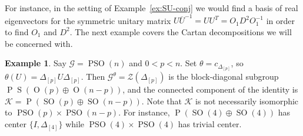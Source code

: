 \documentclass[reqno]{amsart}
\theoremstyle{definition} \newtheorem{example}[theorem]{Example}
\newcommand{\SO}{\operatorname{SO}}
\newcommand{\PSO}{\operatorname{PSO}}
\renewcommand{\O}{\operatorname{O}}
\renewcommand{\P}{\operatorname{P}}
\renewcommand{\S}{\operatorname{S}}
\newcommand{\G}{\mathcal{G}}
\newcommand{\K}{\mathcal{K}}
\newcommand{\Z}{\mathcal{Z}}
\begin{document}
For instance, in the setting of Example~\ref{ex:SU-conj} we would find a basis of real eigenvectors for the symmetric unitary matrix $U\overline{U}^{-1} = UU^T = O_1 D^2 O_1^{-1}$ in order to find $O_1$ and $D^2$. The next example covers the Cartan decompositions we will be concerned with.
\begin{example} \label{ex:SO-block}
Say $\G = \PSO(n)$ and $0 < p < n$. Set $\theta = c_{\Delta_{[p]}}$, so $\theta(U) = \Delta_{[p]}U\Delta_{[p]}$.  Then $\G^\theta = \Z(\Delta_{[p]})$ is the block-diagonal subgroup $\P\S(\O(p) \oplus \O(n-p))$, and the connected component of the identity is $\K = \P(\SO(p) \oplus \SO(n-p))$. Note that $\K$ is not necessarily isomorphic to $\PSO(p) \times \PSO(n-p)$.  For instance, $\P(\SO(4) \oplus \SO(4))$ has center $\{I,  \Delta_{[4]}\}$ while $\PSO(4) \times \PSO(4)$ has trivial center.


\end{example}
\end{document}
